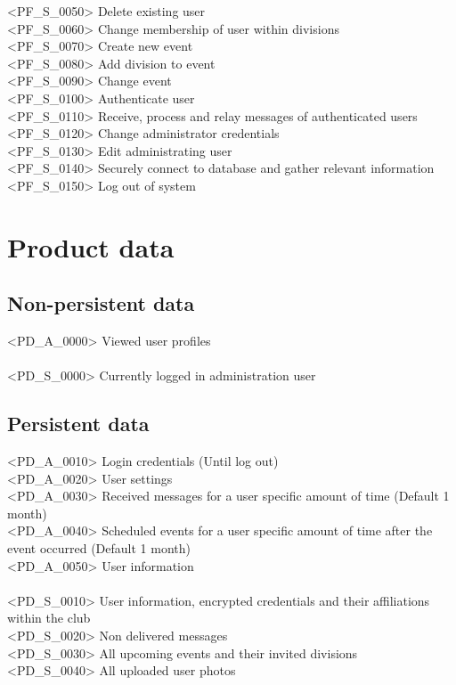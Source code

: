 <PF\_S\_0050> Delete existing user \\
<PF\_S\_0060> Change membership of user within divisions \\
<PF\_S\_0070> Create new event \\
<PF\_S\_0080> Add division to event \\
<PF\_S\_0090> Change event \\
<PF\_S\_0100> Authenticate user \\
<PF\_S\_0110> Receive, process and relay messages of authenticated users \\
<PF\_S\_0120> Change administrator credentials \\
<PF\_S\_0130> Edit administrating user \\
<PF\_S\_0140> Securely connect to database and gather relevant information \\
<PF\_S\_0150> Log out of system  \\

\chapter{Product data}
\section{Non-persistent data}
<PD\_A\_0000> Viewed user profiles \\
\\
<PD\_S\_0000> Currently logged in administration user \\


\section{Persistent data}
<PD\_A\_0010> Login credentials (Until log out) \\
<PD\_A\_0020> User settings \\
<PD\_A\_0030> Received messages for a user specific amount of time (Default 1 month) \\
<PD\_A\_0040> Scheduled events for a user specific amount of time after the event occurred (Default 1 month) \\
<PD\_A\_0050> User information \\
\\
<PD\_S\_0010> User information, encrypted credentials and their affiliations within the club \\
<PD\_S\_0020> Non delivered messages \\
<PD\_S\_0030> All upcoming events and their invited divisions \\
<PD\_S\_0040> All uploaded user photos \\

